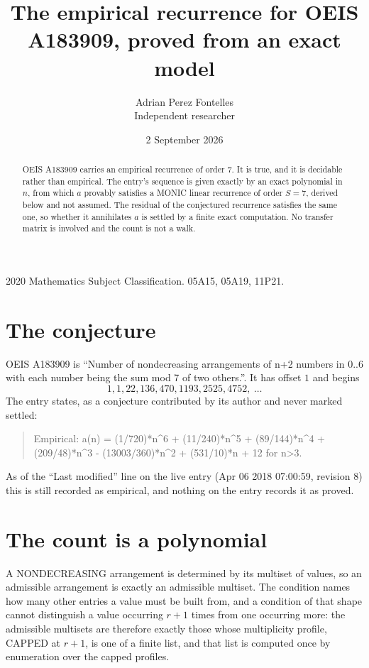 \documentclass[11pt,a4paper]{article}
\title{The empirical recurrence for OEIS A183909, proved from an exact model}
\author{Adrian Perez Fontelles\\ \small Independent researcher}
\date{2 September 2026}
\theoremstyle{plain}
\theoremstyle{definition}
\begin{document}
\maketitle

\begin{abstract}
OEIS A183909 carries an empirical recurrence of order $7$. It is true, and it is
decidable rather than empirical. The entry's sequence is given exactly by an exact polynomial in $n$, from
which $a$ provably satisfies a MONIC linear recurrence of order $S=7$, derived below and not
assumed. The residual of the conjectured recurrence satisfies the same one, so whether it
annihilates $a$ is settled by a finite exact computation. No transfer matrix is involved and
the count is not a walk.
\end{abstract}

\noindent\small 2020 Mathematics Subject Classification. 05A15, 05A19, 11P21.\normalsize

\section{The conjecture}

OEIS A183909 is ``Number of nondecreasing arrangements of n+2 numbers in 0..6 with each number being the sum mod 7 of two others.''. It has offset $1$ and begins
\[
1, 1, 22, 136, 470, 1193, 2525, 4752,\ \dots
\]
The entry states, as a conjecture contributed by its author and never marked settled:
\begin{quote}
Empirical: a(n) = (1/720)*n\^{}6 + (11/240)*n\^{}5 + (89/144)*n\^{}4 + (209/48)*n\^{}3 - (13003/360)*n\^{}2 + (531/10)*n + 12 for n>3.
\end{quote}
As of the ``Last modified'' line on the live entry (Apr 06 2018 07:00:59, revision 8)
this is still recorded as empirical, and nothing on the entry records it as proved.

\section{The count is a polynomial}

A NONDECREASING arrangement is determined by its multiset of values, so an admissible
arrangement is exactly an admissible multiset. The condition names how many other entries a
value must be built from, and a condition of that shape cannot distinguish a value occurring
$r+1$ times from one occurring more: the admissible multisets are therefore exactly those
whose multiplicity profile, CAPPED at $r+1$, is one of a finite list, and that list is computed
once by enumeration over the capped profiles.
\end{document}
